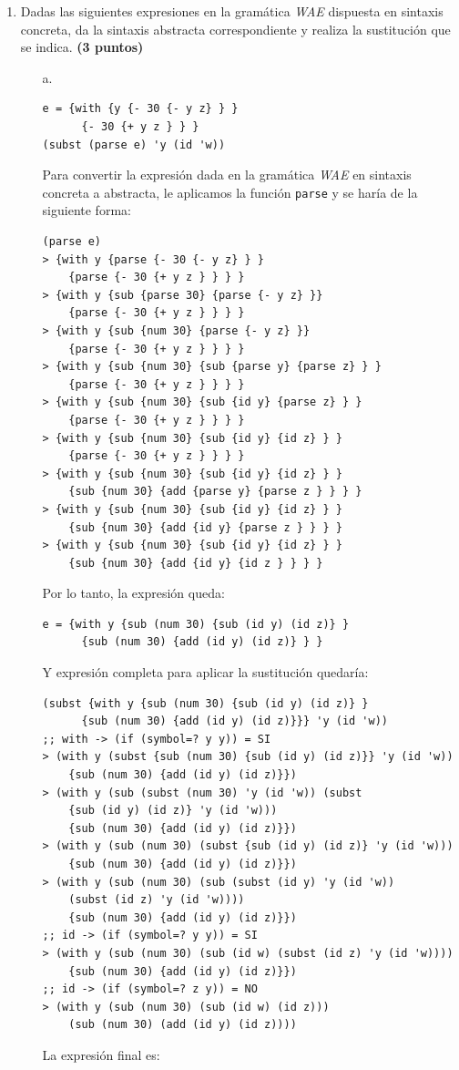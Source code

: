 \documentclass[11pt]{article}
\begin{document}
\begin{enumerate}[leftmargin=0.8cm]
    \item Dadas las siguientes expresiones en la gramática \textit{WAE} dispuesta en sintaxis concreta, da la sintaxis abstracta correspondiente y realiza la sustitución que se indica. \textbf{(3 puntos)}
    \begin{enumerate}
        \item[a.] \begin{lstlisting}
e = {with {y {- 30 {- y z} } }
      {- 30 {+ y z } } }
(subst (parse e) 'y (id 'w))
        \end{lstlisting}
        Para convertir la expresión dada en la gramática \textit{WAE} en sintaxis concreta a abstracta, le aplicamos la función \texttt{parse} y se haría de la siguiente forma:
        \begin{lstlisting}
(parse e)
> {with y {parse {- 30 {- y z} } }
    {parse {- 30 {+ y z } } } }
> {with y {sub {parse 30} {parse {- y z} }}
    {parse {- 30 {+ y z } } } }
> {with y {sub {num 30} {parse {- y z} }}
    {parse {- 30 {+ y z } } } }
> {with y {sub {num 30} {sub {parse y} {parse z} } }
    {parse {- 30 {+ y z } } } }
> {with y {sub {num 30} {sub {id y} {parse z} } }
    {parse {- 30 {+ y z } } } }
> {with y {sub {num 30} {sub {id y} {id z} } }
    {parse {- 30 {+ y z } } } }
> {with y {sub {num 30} {sub {id y} {id z} } }
    {sub {num 30} {add {parse y} {parse z } } } }
> {with y {sub {num 30} {sub {id y} {id z} } }
    {sub {num 30} {add {id y} {parse z } } } }
> {with y {sub {num 30} {sub {id y} {id z} } }
    {sub {num 30} {add {id y} {id z } } } }
        \end{lstlisting}
        Por lo tanto, la expresión queda:
        \begin{lstlisting}
e = {with y {sub (num 30) {sub (id y) (id z)} }
      {sub (num 30) {add (id y) (id z)} } }
        \end{lstlisting}
        Y expresión completa para aplicar la sustitución quedaría:
        \begin{lstlisting}
(subst {with y {sub (num 30) {sub (id y) (id z)} }
      {sub (num 30) {add (id y) (id z)}}} 'y (id 'w))
;; with -> (if (symbol=? y y)) = SI
> (with y (subst {sub (num 30) {sub (id y) (id z)}} 'y (id 'w))
    {sub (num 30) {add (id y) (id z)}})
> (with y (sub (subst (num 30) 'y (id 'w)) (subst
    {sub (id y) (id z)} 'y (id 'w)))
    {sub (num 30) {add (id y) (id z)}})
> (with y (sub (num 30) (subst {sub (id y) (id z)} 'y (id 'w)))
    {sub (num 30) {add (id y) (id z)}})
> (with y (sub (num 30) (sub (subst (id y) 'y (id 'w))
    (subst (id z) 'y (id 'w))))
    {sub (num 30) {add (id y) (id z)}})
;; id -> (if (symbol=? y y)) = SI
> (with y (sub (num 30) (sub (id w) (subst (id z) 'y (id 'w))))
    {sub (num 30) {add (id y) (id z)}})
;; id -> (if (symbol=? z y)) = NO
> (with y (sub (num 30) (sub (id w) (id z)))
    (sub (num 30) (add (id y) (id z))))
        \end{lstlisting}
        La expresión final es:\\


\end{enumerate}
\end{enumerate}
\end{document}
